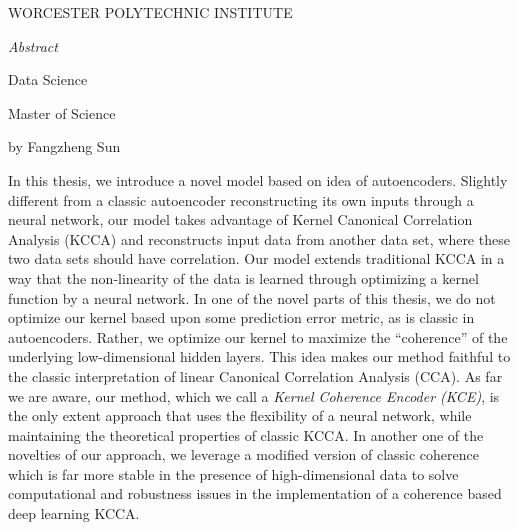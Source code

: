 \documentclass[12pt]{report} %
\begin{document}
\begin{center}
	WORCESTER POLYTECHNIC INSTITUTE\\
	\vspace{1 in}
	\begin{Large}
		\emph{Abstract}\\
	\end{Large}
	\vspace{30 bp}
	\begin{small}
		Data Science\\
	\end{small}
	\vspace{15 bp}
	\begin{small}
		Master of Science\\
	\end{small}
	\vspace{15 bp}
	\begin{small}
		by Fangzheng Sun\\
	\end{small}
\end{center}
In this thesis, we introduce a novel model based on idea of autoencoders. Slightly different from a classic autoencoder reconstructing its own inputs through a neural network, our model takes advantage of Kernel Canonical Correlation Analysis (KCCA) and reconstructs input data from another data set, where these two data sets should have correlation. Our model extends traditional KCCA in a way that the non-linearity of the data is learned through optimizing a kernel function by a neural network. In one of the novel parts of this thesis, we do not optimize our kernel based upon some prediction error metric, as is classic in autoencoders. Rather, we optimize our kernel to maximize the ``coherence'' of the underlying low-dimensional hidden layers. This idea makes our method faithful to the classic interpretation of linear Canonical Correlation Analysis (CCA). 
As far we are aware, our method, which we call a \textit{Kernel Coherence Encoder (KCE)},  is the only extent approach that uses the flexibility of a neural network, while maintaining the theoretical properties of classic KCCA. In another one of the novelties of our approach, we leverage a modified version of classic coherence which is far more stable in the presence of high-dimensional data to solve computational and robustness issues in the implementation of a coherence based deep learning KCCA.

\clearpage
\end{document}
